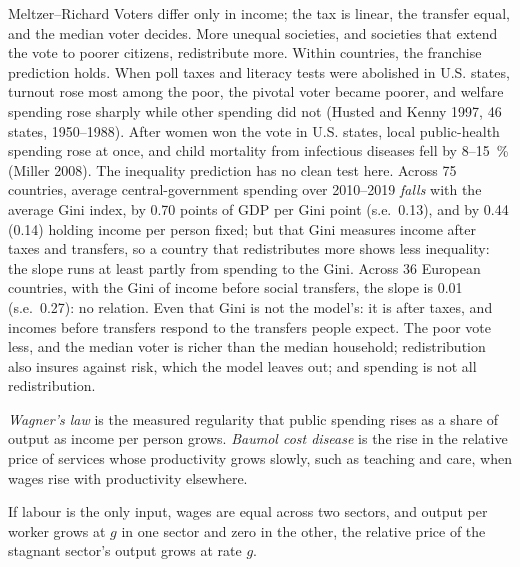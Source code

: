 \begin{model}{Meltzer--Richard}
\assumes Voters differ only in income; the tax is linear, the transfer equal, and
the median voter decides.
\predicts More unequal societies, and societies that extend the vote to poorer
citizens, redistribute more.
\tested Within countries, the franchise prediction holds. When poll taxes and literacy
tests were abolished in U.S. states, turnout rose most among the poor, the pivotal
voter became poorer, and welfare spending rose sharply while other spending did not
(Husted and Kenny 1997, 46 states, 1950--1988). %
After women won the vote in U.S. states, local public-health spending rose at once,
and child mortality from infectious diseases fell by 8--15~\% (Miller 2008).
The inequality prediction has no clean test here. Across 75 countries, average
central-government spending over 2010--2019 \emph{falls} with the average Gini index,
by 0.70 points of GDP per Gini point (s.e.\ 0.13), and by 0.44 (0.14) holding income
per person fixed; but that Gini measures income after taxes and transfers, so a
country that redistributes more shows less inequality: the slope runs at least partly
from spending to the Gini. Across 36 European countries, with the Gini of income
before social transfers, the slope is 0.01 (s.e.\ 0.27): no relation. %
Even that Gini is not the model's: it is after taxes, and incomes before transfers
respond to the transfers people expect.
\breaks The poor vote less, and the median voter is richer than the median
household; redistribution also insures against risk, which the model leaves out;
and spending is not all redistribution.
\end{model}

\begin{definition}\label{def:b3:public-choice-voting:size-of-government}
\emph{Wagner's law} is the measured regularity that public spending rises as a share
of output as income per person grows. \emph{Baumol cost disease} is the rise in the
relative price of services whose productivity grows slowly, such as teaching and
care, when wages rise with productivity elsewhere.
\end{definition}

\begin{proposition}\label{prop:b3:public-choice-voting:baumol}
If labour is the only input, wages are equal across two sectors, and output per
worker grows at $g$ in one sector and zero in the other, the relative price of the
stagnant sector's output grows at rate $g$.
\end{proposition}

